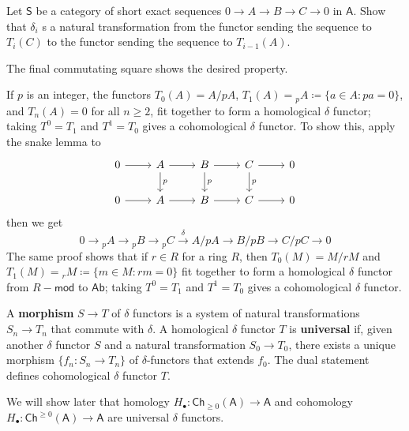\begin{exer} Let $\mathsf{S}$ be a category of short exact sequences $0\rightarrow A\rightarrow B\rightarrow C\rightarrow 0$ in $\mathsf{A}$. Show that $\delta_i$ s a natural transformation from the functor sending the sequence to $T_i(C)$ to the functor sending the sequence to $T_{i-1}(A)$.
\end{exer}
\begin{solution}
The final commutating square shows the desired property.
\end{solution}

\begin{exmp}[$p$-torsion] If $p$ is an integer, the functors $T_0(A)=A/pA$, $T_1(A)={}_p A\coloneqq \{a\in A:pa=0\}$, and $T_n(A)=0$ for all $n\geq 2$, fit together to form a homological $\delta$ functor; taking $T^0=T_1$ and $T^1=T_0$ gives a cohomological $\delta$ functor. To show this, apply the snake lemma to
\begin{equation}
\begin{tikzcd}
0\arrow[r]& A\arrow[r] \arrow{d}{p}& B\arrow[r] \arrow{d}{p} & C\arrow[r] \arrow{d}{p} & 0\\
0\arrow[r]&A\arrow[r]&B\arrow[r]&C\arrow[r]&0 
\end{tikzcd}
\end{equation}
then we get
\begin{equation}
0\rightarrow {}_pA\rightarrow {}_pB\rightarrow {}_pC\xrightarrow{\delta}A/pA\rightarrow B/pB\rightarrow C/pC\rightarrow 0
\end{equation}
The same proof shows that if $r\in R$ for a ring $R$, then $T_0(M)=M/rM$ and $T_1(M)={}_rM\coloneqq \{m\in M:rm=0\}$ fit together to form a homological $\delta$ functor from $R-\mathsf{mod}$ to $\mathsf{Ab}$; taking $T^0=T_1$ and $T^1=T_0$ gives a cohomological $\delta$ functor.
\end{exmp}

\begin{defn} A \textbf{morphism} $S\rightarrow T$ of $\delta$ functors is a system of natural transformations $S_n\rightarrow T_n$ that commute with $\delta$. A homological $\delta$ functor $T$ is \textbf{universal} if, given another $\delta$ functor $S$ and a natural transformation $S_0\rightarrow T_0$, there exists a unique morphism $\{f_n:S_n\rightarrow T_n\}$ of $\delta$-functors that extends $f_0$. The dual statement defines cohomological $\delta$ functor $T$.
\end{defn}

\begin{exmp} We will show later that homology $H_\bullet:\mathsf{Ch}_{\geq 0}(\mathsf{A})\rightarrow \mathsf{A}$ and cohomology $H_\bullet:\mathsf{Ch}^{\geq 0}(\mathsf{A})\rightarrow \mathsf{A}$ are universal $\delta$ functors.
\end{exmp}

